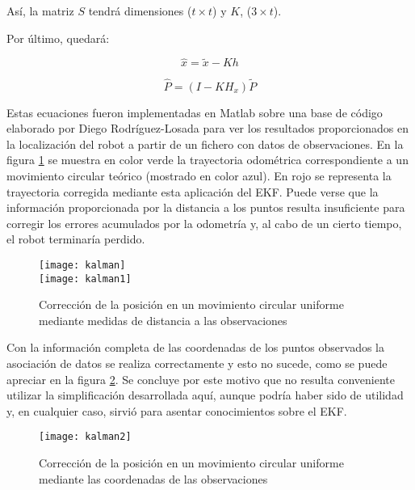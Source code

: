 Así, la matriz $S$ tendrá dimensiones ($t \times t$) y $K$, ($3 \times t$).

Por último, quedará:

\begin{equation}\label{eq:x1}
    \hat{x} = \tilde{x} - Kh
\end{equation}

\begin{equation}\label{eq:P1}
    \hat{P} = (I-KH_{x})\tilde{P}
\end{equation}

Estas ecuaciones fueron implementadas en Matlab sobre una base de código elaborado por Diego Rodríguez-Losada para ver los resultados proporcionados en la localización del robot a partir de un fichero con datos de observaciones. En la figura \ref{fg:matlab1} se muestra en color verde la trayectoria odométrica correspondiente a un movimiento circular teórico (mostrado en color azul). En rojo se representa la trayectoria corregida mediante esta aplicación del EKF. Puede verse que la información proporcionada por la distancia a los puntos resulta insuficiente para corregir los errores acumulados por la odometría y, al cabo de un cierto tiempo, el robot terminaría perdido.

\begin{figure}[h]
  \centering\texttt{[image: kalman]}\\
  \hspace{0.1cm}\texttt{[image: kalman1]}
  \caption{Corrección de la posición en un movimiento circular uniforme mediante medidas de distancia a las observaciones}\label{fg:matlab1}
\end{figure}

Con la información completa de las coordenadas de los puntos observados la asociación de datos se realiza correctamente y esto no sucede, como se puede apreciar en la figura \ref{fg:matlab2}. Se concluye por este motivo que no resulta conveniente utilizar la simplificación desarrollada aquí, aunque podría haber sido de utilidad y, en cualquier caso, sirvió para asentar conocimientos sobre el EKF.

\begin{figure}[h]
  \centering\texttt{[image: kalman2]}\\
  \caption{Corrección de la posición en un movimiento circular uniforme mediante las coordenadas de las observaciones}\label{fg:matlab2}
\end{figure} 